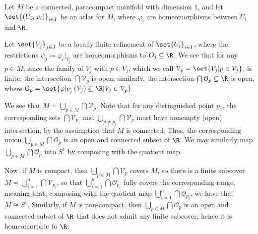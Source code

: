 \documentclass[10pt]{mypackage}
\begin{document}
\begin{solution}
  Let $M$ be a connected, paracompact manifold with dimension $1$, and let $\set{\left( U_i,\varphi_i \right)}_{i\in I}$ be an atlas for $M$, where $\varphi_i$ are homeomorphisms between $U_i$ and $\R$.\newline

  Let $\set{V_{j}}_{j\in J}$ be a locally finite refinement of $\set{U_i}_{i\in I}$, where the restrictions $\psi_j \coloneq \varphi_i|_{V_j}$ are homeomorphisms to $O_{j}\subseteq \R$. We see that for any $p\in M$, since the family of $V_j$ with $p\in V_j$, which we call $\mathcal{V}_p = \set{V_j | p\in V_j}$, is finite, the intersection $\bigcap \mathcal{V}_p$ is open; similarly, the intersection $\bigcap \mathcal{O}_p\subseteq \R$ is open, where $\mathcal{O}_p = \set{\varphi\vert_{V_j}\left( V_j \right)\subseteq \R | V_j\in \mathcal{V}_p}$.\newline

  We see that $M = \bigcup_{p\in M} \bigcap \mathcal{V}_p$. Note that for any distinguished point $p_1$, the corresponding sets $\bigcap \mathcal{V}_{p_1}$ and $\bigcup_{p\neq p_1} \bigcap \mathcal{V}_{p}$ must have nonempty (open) intersection, by the assumption that $M$ is connected. Thus, the corresponding union $\bigcup_{p\in M}\bigcap \mathcal{O}_p$ is an open and connected subset of $\R$. We may similarly map $\bigcup_{p\in M} \bigcap \mathcal{O}_p$ into $S^1$ by composing with the quotient map.\newline

  Now, if $M$ is compact, then $\bigcup_{p\in M}\bigcap \mathcal{V}_p$ covers $M$, so there is a finite subcover $M = \bigcup_{i=1}^{n}\bigcap \mathcal{V}_{p_i}$, so that $\bigcup_{i=1}^{n}\bigcap \mathcal{O}_{p_i}$ fully covers the corresponding range, meaning that, composing with the quotient map $\bigcup_{i=1}^{n} \bigcap \mathcal{O}_{p_i}$, we have that $M \cong S^{1}$. Similarly, if $M$ is non-compact, then $\bigcup_{p\in M}\bigcap\mathcal{O}_p$ is an open and connected subset of $\R$ that does not admit any finite subcover, hence it is homeomorphic to $\R$.
\end{solution}
\end{document}
